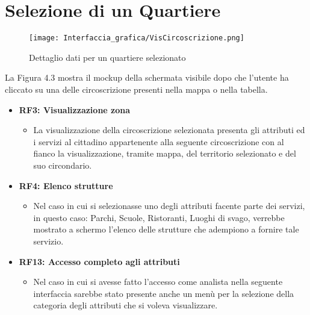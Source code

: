 \newpage
\section{Selezione di un Quartiere}
    \begin{figure}[H]
        \center
        \texttt{[image: Interfaccia\_grafica/VisCircoscrizione.png]}
        \caption{Dettaglio dati per un quartiere selezionato}
    \end{figure}    

    La Figura 4.3 mostra il mockup della schermata visibile dopo che l'utente ha cliccato su una delle circoscrizione presenti nella mappa o nella tabella.

    \begin{itemize}
        \item \textbf{RF3: Visualizzazione zona} \begin{itemize}
            \item La visualizzazione della circoscrizione selezionata presenta gli attributi ed i servizi al cittadino appartenente alla seguente circoscrizione con al fianco la visualizzazione, tramite mappa, del territorio selezionato e del suo circondario.
        \end{itemize}
        \item \textbf{RF4: Elenco strutture} \begin{itemize}
            \item Nel caso in cui si selezionasse uno degli attributi facente parte dei servizi, in questo caso: Parchi, Scuole, Ristoranti, Luoghi di svago, verrebbe mostrato a schermo l'elenco delle strutture che adempiono a fornire tale servizio.
        \end{itemize}
        \item \textbf{RF13: Accesso completo agli attributi} \begin{itemize}
            \item Nel caso in cui si avesse fatto l'accesso come analista nella seguente interfaccia sarebbe stato presente anche un menù per la selezione della categoria degli attributi che si voleva visualizzare.
        \end{itemize}
    \end{itemize}
